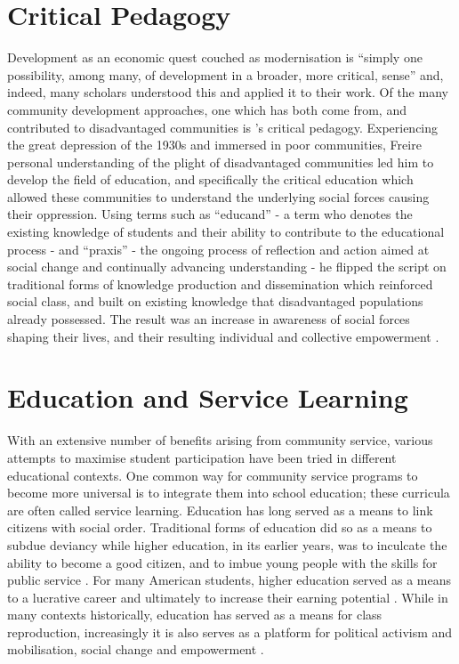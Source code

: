 \section{Critical Pedagogy} 

Development as an economic quest couched as modernisation is “simply one possibility, among many, of development in a broader, more critical, sense” \citep[][p482, quoting his 1971 article]{Goulet1980} and, indeed, many scholars understood this and applied it to their work. Of the many community development approaches, one which has both come from, and contributed to disadvantaged communities is \citet{Freire2000}'s critical pedagogy. Experiencing the great depression of the 1930s and immersed in poor communities, Freire personal understanding of the plight of disadvantaged communities led him to develop the field of education, and specifically the critical education which allowed these communities to understand the underlying social forces causing their oppression. Using terms such as “educand” - a term who denotes the existing knowledge of students and their ability to contribute to the educational process - and “praxis” - the ongoing process of reflection and action aimed at social change and continually advancing understanding - he flipped the script on traditional forms of knowledge production and dissemination which reinforced social class, and built on existing knowledge that disadvantaged populations already possessed. The result was an increase in awareness of social forces shaping their lives, and their resulting individual and collective empowerment \citep{Freire1969,Freire2000}.








\section{Education and Service Learning} 
With an extensive number of benefits arising from community service, various attempts to maximise student participation have been tried in different educational contexts. 
One common way for community service programs to become more universal is to integrate them into school education; these curricula are often called service learning. Education has long served as a means to link citizens with social order. Traditional forms of education did so as a means to subdue deviancy %
while higher education, in its earlier years, was to inculcate the ability to become a good citizen, and to imbue young people with the skills for public service \citep{London2000}. 
For many American students, higher education served as a means to a lucrative career and ultimately to increase their earning potential \citep{Karlberg2005}. %
While in many contexts historically, education has served as a means for class reproduction, increasingly it is also serves as a platform for political activism and mobilisation, social change and empowerment \citep{Freire2000,Shultz2007}.


